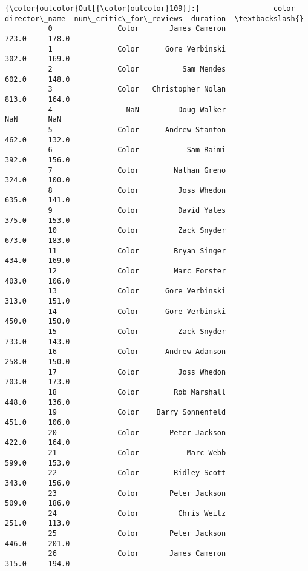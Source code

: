 \documentclass[11pt]{article}
\begin{document}
\begin{Verbatim}[commandchars=\\\{\}]
{\color{outcolor}Out[{\color{outcolor}109}]:}                 color       director\_name  num\_critic\_for\_reviews  duration  \textbackslash{}
          0               Color       James Cameron                   723.0     178.0   
          1               Color      Gore Verbinski                   302.0     169.0   
          2               Color          Sam Mendes                   602.0     148.0   
          3               Color   Christopher Nolan                   813.0     164.0   
          4                 NaN         Doug Walker                     NaN       NaN   
          5               Color      Andrew Stanton                   462.0     132.0   
          6               Color           Sam Raimi                   392.0     156.0   
          7               Color        Nathan Greno                   324.0     100.0   
          8               Color         Joss Whedon                   635.0     141.0   
          9               Color         David Yates                   375.0     153.0   
          10              Color         Zack Snyder                   673.0     183.0   
          11              Color        Bryan Singer                   434.0     169.0   
          12              Color        Marc Forster                   403.0     106.0   
          13              Color      Gore Verbinski                   313.0     151.0   
          14              Color      Gore Verbinski                   450.0     150.0   
          15              Color         Zack Snyder                   733.0     143.0   
          16              Color      Andrew Adamson                   258.0     150.0   
          17              Color         Joss Whedon                   703.0     173.0   
          18              Color        Rob Marshall                   448.0     136.0   
          19              Color    Barry Sonnenfeld                   451.0     106.0   
          20              Color       Peter Jackson                   422.0     164.0   
          21              Color           Marc Webb                   599.0     153.0   
          22              Color        Ridley Scott                   343.0     156.0   
          23              Color       Peter Jackson                   509.0     186.0   
          24              Color         Chris Weitz                   251.0     113.0   
          25              Color       Peter Jackson                   446.0     201.0   
          26              Color       James Cameron                   315.0     194.0   

\end{Verbatim}
\end{document}
